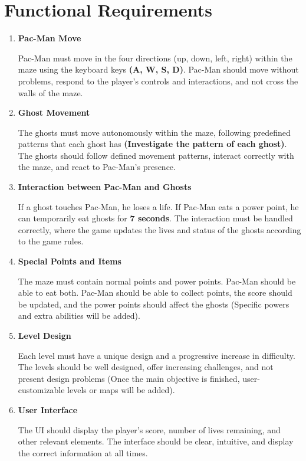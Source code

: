 \documentclass{article}
\begin{document}
\section*{Functional Requirements}
\begin{enumerate}
    \item \textbf{Pac-Man Move}
    
    Pac-Man must move in the four directions (up, down, left, right) within the maze using the keyboard keys \textbf{(A, W, S, D)}. Pac-Man should move without problems, respond to the player's controls and interactions, and not cross the walls of the maze.
    
    \item \textbf{Ghost Movement}
    
    The ghosts must move autonomously within the maze, following predefined patterns that each ghost has \textbf{(Investigate the pattern of each ghost)}. The ghosts should follow defined movement patterns, interact correctly with the maze, and react to Pac-Man's presence.
    
    \item \textbf{Interaction between Pac-Man and Ghosts}
    
    If a ghost touches Pac-Man, he loses a life. If Pac-Man eats a power point, he can temporarily eat ghosts for \textbf{7 seconds}. The interaction must be handled correctly, where the game updates the lives and status of the ghosts according to the game rules.
    
    \item \textbf{Special Points and Items}
    
    The maze must contain normal points and power points. Pac-Man should be able to eat both. Pac-Man should be able to collect points, the score should be updated, and the power points should affect the ghosts (Specific powers and extra abilities will be added).
    
    \item \textbf{Level Design}
    
    Each level must have a unique design and a progressive increase in difficulty. The levels should be well designed, offer increasing challenges, and not present design problems (Once the main objective is finished, user-customizable levels or maps will be added).
    
    \item \textbf{User Interface}
    
    The UI should display the player's score, number of lives remaining, and other relevant elements. The interface should be clear, intuitive, and display the correct information at all times.
    

\end{enumerate}
\end{document}
